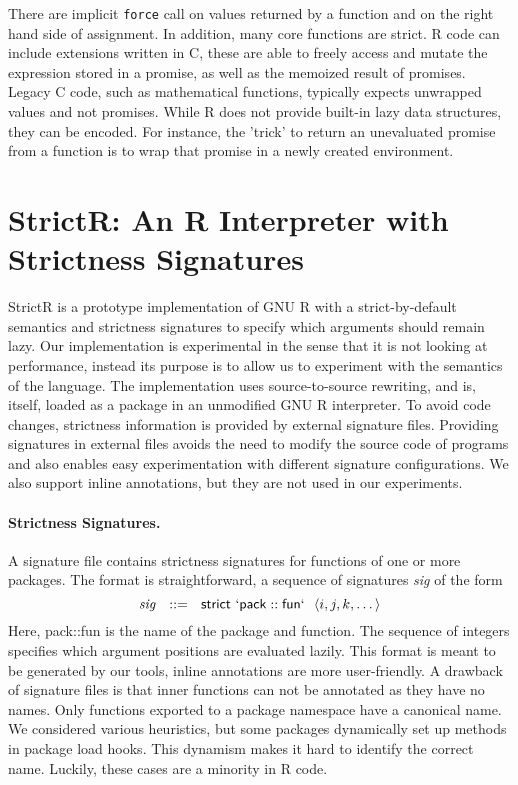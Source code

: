 \documentclass[review,creen,acmsmall]{acmart}
\renewcommand{\c}[1]{\lstinline |#1|\xspace}
\newcommand{\strictr}{{\sf StrictR}\xspace}
\begin{document}
There are implicit \c{force} call on values returned by a function and on the
right hand side of assignment. In addition, many core functions are strict. R
code can include extensions written in C, these are able to freely access and
mutate the expression stored in a promise, as well as the memoized result of
promises. Legacy C code, such as mathematical functions, typically expects
unwrapped values and not promises. While R does not provide built-in lazy data
structures, they can be encoded. For instance, the 'trick' to return an
unevaluated promise from a function is to wrap that promise in a newly created
environment.

\section{StrictR: An R Interpreter with Strictness Signatures}\label{sec:strictr}

\strictr is a prototype implementation of GNU R with a strict-by-default
semantics and strictness signatures to specify which arguments should remain
lazy. Our implementation is experimental in the sense that it is not looking at
performance, instead its purpose is to allow us to experiment with the semantics
of the language. The implementation uses source-to-source rewriting, and is,
itself, loaded as a package in an unmodified GNU R interpreter. To avoid code
changes, strictness information is provided by external signature files.
Providing signatures in external files avoids the need to modify the source code
of programs and also enables easy experimentation with different signature
configurations. We also support inline annotations, but they are not used in our
experiments.


\paragraph{Strictness Signatures.}
A signature file contains strictness signatures for functions of one or more
packages. The format is straightforward, a sequence of signatures \emph{sig} of
the form
%
\[
\mathit{sig}~~::=~~\mathsf{strict}~\mathsf{`pack}::\mathsf{fun`}~~\langle i, j, k, \dots\rangle
\]
%
Here, {\sf pack::fun} is the name of the package and function. The sequence of
integers specifies which argument positions are evaluated lazily. This format is
meant to be generated by our tools, inline annotations are more user-friendly. A
drawback of signature files is that inner functions can not be annotated as they
have no names. Only functions exported to a package namespace have a canonical
name. We considered various heuristics, but some packages dynamically set up
methods in package load hooks. This dynamism makes it hard to identify the
correct name. Luckily, these cases are a minority in R code.
\end{document}
